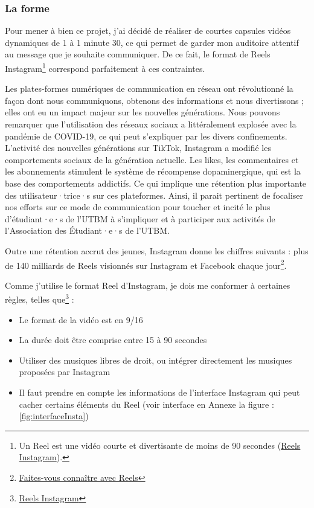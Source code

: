 \subsubsection{La forme}

Pour mener à bien ce projet, j'ai décidé de réaliser de courtes capsules vidéos dynamiques de 1 à 1 minute 30, ce qui permet de garder mon auditoire attentif au message que je souhaite communiquer.
De ce fait, le format de Reels Instagram\footnote{Un Reel est une vidéo courte et divertisante de moins de 90 secondes (\href{https://about.instagram.com/fr-fr/features/reels}{Reels Instagram}).} correspond parfaitement à ces contraintes.

Les plates-formes numériques de communication en réseau ont révolutionné la façon dont nous communiquons, obtenons des informations et nous divertissons ; elles ont eu un impact majeur sur les nouvelles générations.
Nous pouvons remarquer que l'utilisation des réseaux sociaux a littéralement explosée avec la pandémie de COVID-19, ce qui peut s'expliquer par les divers confinements.
L'activité des nouvelles générations sur TikTok, Instagram a modifié les comportements sociaux de la génération actuelle.
Les likes, les commentaires et les abonnements stimulent le système de récompense dopaminergique, qui est la base des comportements addictifs\cite{pedrouzo2023hyperconnected}.
Ce qui implique une rétention plus importante des utilisateur·trice·s sur ces plateformes.
Ainsi, il parait pertinent de focaliser nos efforts sur ce mode de communication pour toucher et incité le plus d'étudiant·e·s de l'\gls{UTBM} à s'impliquer et à participer aux activités de l'Association des Étudiant·e·s de l'\gls{UTBM}.

Outre une rétention accrut des jeunes, Instagram donne les chiffres suivants : plus de 140 milliards de Reels visionnés sur Instagram et Facebook chaque jour\footnote{\href{https://business.instagram.com/instagram-reels?locale=fr_FR}{Faites-vous connaître avec Reels}}.

Comme j'utilise le format Reel d'Instagram, je dois me conformer à certaines règles, telles que\footnote{\href{https://about.instagram.com/fr-fr/features/reels}{Reels Instagram}} :
\begin{itemize}
    \item Le format de la vidéo est en 9/16
    \item La durée doit être comprise entre 15 à 90 secondes
    \item Utiliser des musiques libres de droit, ou intégrer directement les musiques proposées par Instagram
    \item Il faut prendre en compte les informations de l'interface Instagram qui peut cacher certains éléments du Reel (voir interface en Annexe la figure : \ref{fig:interfaceInsta})
\end{itemize}


